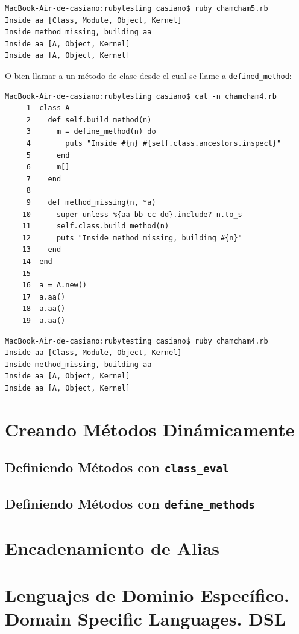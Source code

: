 \begin{verbatim}
MacBook-Air-de-casiano:rubytesting casiano$ ruby chamcham5.rb 
Inside aa [Class, Module, Object, Kernel]
Inside method_missing, building aa
Inside aa [A, Object, Kernel]
Inside aa [A, Object, Kernel]
\end{verbatim}

O bien 
llamar a un método de clase desde el cual se llame
a \verb|defined_method|:

\begin{verbatim}
MacBook-Air-de-casiano:rubytesting casiano$ cat -n chamcham4.rb 
     1  class A
     2    def self.build_method(n)
     3      m = define_method(n) do 
     4        puts "Inside #{n} #{self.class.ancestors.inspect}" 
     5      end
     6      m[]
     7    end
     8  
     9    def method_missing(n, *a)
    10      super unless %{aa bb cc dd}.include? n.to_s
    11      self.class.build_method(n)
    12      puts "Inside method_missing, building #{n}" 
    13    end
    14  end
    15  
    16  a = A.new()
    17  a.aa()
    18  a.aa()
    19  a.aa()
\end{verbatim}

\begin{verbatim}
MacBook-Air-de-casiano:rubytesting casiano$ ruby chamcham4.rb 
Inside aa [Class, Module, Object, Kernel]
Inside method_missing, building aa
Inside aa [A, Object, Kernel]
Inside aa [A, Object, Kernel]
\end{verbatim}


\section{Creando Métodos Dinámicamente}

\subsection{Definiendo Métodos con {\tt class\_eval}}

\subsection{Definiendo Métodos con {\tt define\_methods}}


\section{Encadenamiento de Alias}

\section{Lenguajes de Dominio Específico. Domain Specific Languages. DSL}

